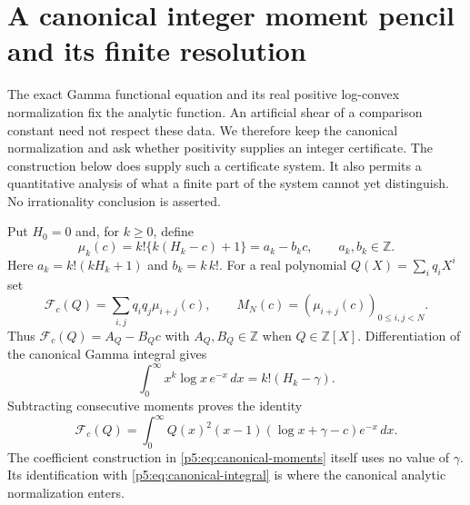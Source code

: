 \documentclass[11pt,a4paper]{article}
\theoremstyle{definition}
\theoremstyle{remark}
\numberwithin{equation}{section}
\begin{document}
\section{A canonical integer moment pencil and its finite resolution}
\label{p5:sec:canonical-pencil}

The exact Gamma functional equation and its real positive log-convex
normalization fix the analytic function.  An artificial shear of a
comparison constant need not respect these data.  We therefore keep
the canonical normalization and ask whether positivity supplies an
integer certificate.  The construction below does supply such a
certificate system.  It also permits a quantitative analysis of what
a finite part of the system cannot yet distinguish.  No irrationality
conclusion is asserted.

Put $H_0=0$ and, for $k\geq0$, define
\begin{equation}\label{p5:eq:canonical-moments}
 \mu_k(c)=k!\{k(H_k-c)+1\}=a_k-b_kc,
 \qquad a_k,b_k\in\mathbb Z.
\end{equation}
Here $a_k=k!(kH_k+1)$ and $b_k=k\,k!$.  For a real polynomial
$Q(X)=\sum_iq_iX^i$ set
\[
 \mathcal F_c(Q)=\sum_{i,j}q_iq_j\mu_{i+j}(c),\qquad
 M_N(c)=(\mu_{i+j}(c))_{0\leq i,j<N}.
\]
Thus $\mathcal F_c(Q)=A_Q-B_Qc$ with $A_Q,B_Q\in\mathbb Z$
when $Q\in\mathbb Z[X]$.  Differentiation of the canonical Gamma
integral gives
\[
 \int_0^\infty x^k\log x\,e^{-x}\,dx=k!(H_k-\gamma).
\]
Subtracting consecutive moments proves the identity
\begin{equation}\label{p5:eq:canonical-integral}
 \mathcal F_c(Q)=\int_0^\infty Q(x)^2
          (x-1)(\log x+\gamma-c)e^{-x}\,dx.
\end{equation}
The coefficient construction in \eqref{p5:eq:canonical-moments} itself
uses no value of $\gamma$.  Its identification with
\eqref{p5:eq:canonical-integral} is where the canonical analytic
normalization enters.
\end{document}
